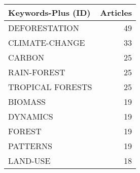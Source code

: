 
\begin{tabular}{lr}
\toprule
Keywords-Plus (ID) & Articles\\
\midrule
DEFORESTATION & 49\\
CLIMATE-CHANGE & 33\\
CARBON & 25\\
RAIN-FOREST & 25\\
TROPICAL FORESTS & 25\\
\addlinespace
BIOMASS & 19\\
DYNAMICS & 19\\
FOREST & 19\\
PATTERNS & 19\\
LAND-USE & 18\\
\bottomrule
\end{tabular}